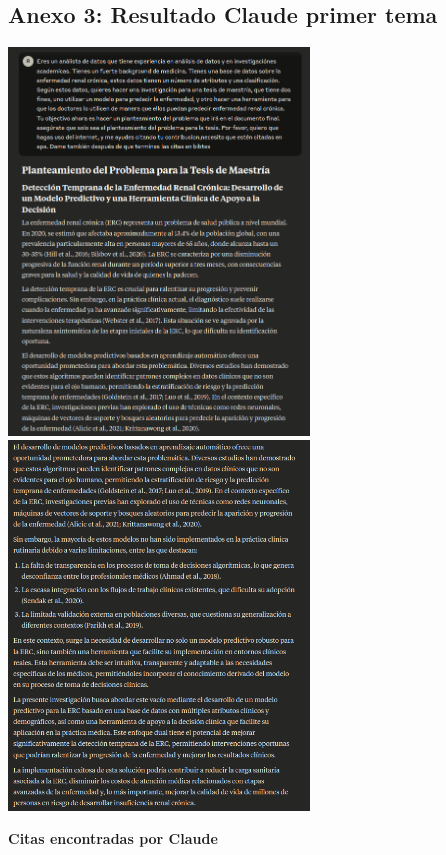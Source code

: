 \documentclass{article}
\begin{document}
\subsection{Anexo 3: Resultado Claude primer tema}
\begin{center}
    \includegraphics[width=0.6\textwidth]{../claude1.png}\\
    \includegraphics[width=0.6\textwidth]{../claude2.png}\\
\end{center}
\textbf{Citas encontradas por Claude}
\end{document}
